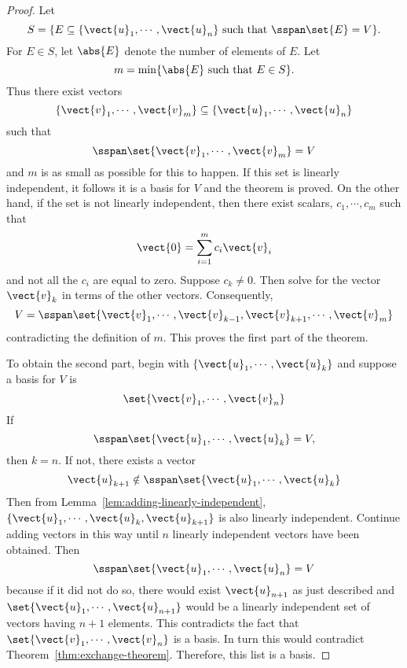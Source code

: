 \begin{proof}Let 
\begin{equation*}
S=\{E\subseteq \{\vect{u}_{1},\cdots ,\vect{u}_{n}\}\text{ such that }%
\sspan\set{E} =V\}.
\end{equation*}
For $E\in S$, let $\abs{E}$ denote the number of elements
of $E$. Let 
\begin{equation*}
m= \min \{\abs{E}\text{ such that }E\in S\}.
\end{equation*}
Thus there exist vectors 
\begin{equation*}
\{\vect{v}_{1},\cdots ,\vect{v}_{m}\}\subseteq \{\vect{u}_{1},\cdots ,%
\vect{u}_{n}\}
\end{equation*}
such that 
\begin{equation*}
\sspan\set{\vect{v}_{1},\cdots ,\vect{v}_{m}} =V
\end{equation*}
and $m$ is as small as possible for this to happen. If this set is linearly
independent, it follows it is a basis for $V$ and the theorem is proved. On
the other hand, if the set is not linearly independent, then there exist
scalars, $c_{1},\cdots ,c_{m}$ such that 
\begin{equation*}
\vect{0}=\sum_{i=1}^{m}c_{i}\vect{v}_{i}
\end{equation*}
and not all the $c_{i}$ are equal to zero. Suppose $c_{k}\neq 0$. Then solve for the
vector $\vect{v}_{k}$ in terms of the other vectors.
Consequently, 
\begin{equation*}
V=\sspan\set{\vect{v}_{1},\cdots ,\vect{v}_{k-1},\vect{v}
_{k+1},\cdots ,\vect{v}_{m}}
\end{equation*}
contradicting the definition of $m$. This proves the first part of the
theorem.

To obtain the second part, begin with $\{\vect{u}_{1},\cdots ,\vect{u}
_{k}\}$ and suppose a basis for $V$ is 
\begin{equation*}
\set{\vect{v}_{1},\cdots ,\vect{v}_{n}} 
\end{equation*}
If 
\begin{equation*}
\sspan\set{\vect{u}_{1},\cdots ,\vect{u}_{k}} =V,
\end{equation*}
then $k=n$. If not, there exists a vector 
\begin{equation*}
\vect{u}_{k+1}\notin \sspan\set{\vect{u}_{1},\cdots ,\vect{u}
_{k}}
\end{equation*}
Then from Lemma~\ref{lem:adding-linearly-independent}, $\{\vect{u}_{1},\cdots ,\vect{u}_{k},
\vect{u}_{k+1}\}$ is also linearly independent. Continue adding vectors in
this way until $n$ linearly independent vectors have been obtained. Then 
\begin{equation*}
\sspan\set{\vect{u}_{1},\cdots ,\vect{u}_{n}} =V
\end{equation*}
because if it did not do so, there would exist $\vect{u}_{n+1}$ as just
described and $\set{\vect{u}_{1},\cdots ,\vect{u}_{n+1}} $
would be a linearly independent set of vectors having $n+1$ elements. This contradicts the fact that $\set{\vect{v}_{1},\cdots ,\vect{v}_{n}} $ is a basis.
 In turn this would contradict Theorem~\ref{thm:exchange-theorem}. Therefore, this list is a
basis. 
\end{proof}

